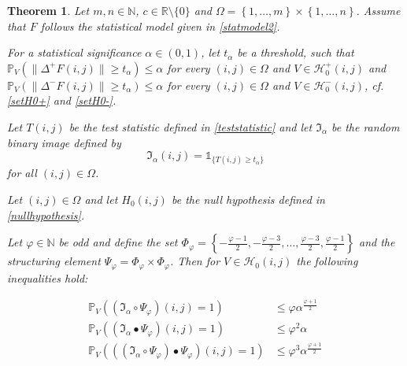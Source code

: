 \documentclass[a4paper,12pt]{article}
\newcommand{\norm}[1]{\lVert#1\rVert}
\theoremstyle{plain}
\newtheorem{theorem}{Theorem}[section]
\theoremstyle{definition}
\numberwithin{equation}{section}
\begin{document}
\begin{theorem}\label{thm: typeIinequalities}
	Let $m, n \in \mathbb{N}$, $c \in \mathbb{R} \setminus \{ 0 \}$ and $\Omega = \left\{ 1, \dots, m \right\} \times \left\{ 1, \dots, n \right\}$. Assume that $F$ follows the statistical model given in \eqref{statmodel2}.
	
	For a statistical significance $\alpha \in (0, 1)$, let $t_\alpha$ be a threshold, such that $\mathbb{P}_V( \norm{\Delta^+ F(i, j)} \geq t_\alpha ) \leq \alpha$ for every $(i, j) \in \Omega$ and $V \in \mathcal{H}_0^+(i, j)$ and $\mathbb{P}_V( \norm{\Delta^- F(i, j)} \geq t_\alpha ) \leq \alpha$ for every $(i, j) \in \Omega$ and $V \in \mathcal{H}_0^-(i, j)$, cf. \eqref{setH0+} and \eqref{setH0-}.
	
	Let $T(i, j)$ be the test statistic defined in \eqref{teststatistic} and let $\mathfrak{I}_\alpha$ be the random binary image defined by
	\begin{equation*}
		\mathfrak{I}_\alpha(i, j) = \mathds{1}_{ \{ T(i, j) \geq t_\alpha \} }
	\end{equation*}
	for all $(i, j) \in \Omega$.
	
	Let $(i, j) \in \Omega$ and let $H_0(i, j)$ be the null hypothesis defined in \eqref{nullhypothesis}.
	
	Let $\varphi \in \mathbb{N}$ be odd and define the set $\Phi_\varphi = \left\{ -\frac{\varphi - 1}{2}, -\frac{\varphi - 3}{2}, \dots, \frac{\varphi - 3}{2}, \frac{\varphi - 1}{2} \right\}$ and the structuring element $\Psi_\varphi = \Phi_\varphi \times \Phi_\varphi$.
	Then for $V \in \mathcal{H}_0(i, j)$ the following inequalities hold:
	\begin{samepage}
		\begin{align}
			\mathbb{P}_V\left( (\mathfrak{I}_\alpha \circ \Psi_\varphi)(i, j) = 1 \right) &\leq \varphi \alpha^{\frac{\varphi + 1}{2}} \label{ineq: typeIopening} \\
			\mathbb{P}_V\left( (\mathfrak{I}_\alpha \bullet \Psi_\varphi)(i, j) = 1 \right) &\leq \varphi^2 \alpha \label{ineq: typeIclosing} \\
			\mathbb{P}_V\left( ((\mathfrak{I}_\alpha \circ \Psi_\varphi) \bullet \Psi_\varphi)(i, j) = 1 \right) &\leq \varphi^3 \alpha^{\frac{\varphi + 1}{2}} \label{ineq: typeIopeningclosing}
		\end{align}
	\end{samepage}
\end{theorem}
\end{document}
